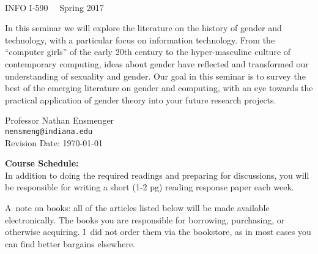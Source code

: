 \documentclass[11pt]{article}
\begin{document}
\thispagestyle{empty}
	
\begin{center}	
	
  \fontsize{28pt}{32pt} \selectfont {Technology \& Gender} \\
  \Large{INFO I-590 \textbullet \ \ Spring 2017}\\

\vspace{0.2in}

\setlength{\fboxsep}{0mm} %
\setlength{\fboxrule}{2pt}

\end{center}
 
\vspace{0.2in}

In this seminar we will explore the literature on the history of gender and technology, with a particular focus on information technology.  From the ``computer girls'' of the early 20th century to the hyper-masculine culture of contemporary computing, ideas about gender have reflected and transformed our understanding of sexuality and gender.  Our goal in this seminar is to survey the best of the emerging literature on gender and computing, with an eye towards the practical application of gender theory into your future research projects.


\vspace{0.1in}

\begin{center} 
 Professor Nathan Ensmenger\\ \texttt{nensmeng@indiana.edu}\\
\vspace{0.1in}
Revision Date: \today
\end{center}

\vspace{0.3in}

\newpage


\newpage
\large{\textbf{Course Schedule:}}\\


\noindent In addition to doing the required readings and preparing for discussions, you will be responsible for writing a short (1-2 pg) reading response paper each week.

\noindent A~note on books: all of the articles listed below will be made available electronically.  The books you are responsible for borrowing, purchasing, or otherwise acquiring.  I~did not order them via the bookstore, as in most cases you can find better bargains elsewhere.
\end{document}
